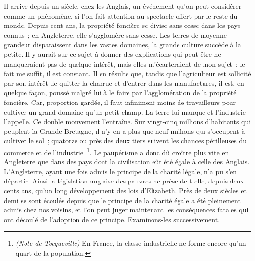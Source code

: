 \documentclass[french,twoside]{book} %
\begin{document}
Il arrive depuis un siècle, chez les Anglais, un événement qu’on peut considérer comme un phénomène, si l’on fait attention au spectacle offert par le reste du monde. Depuis cent ans, la propriété foncière se divise sans cesse dans les pays connus ; en Angleterre, elle s’agglomère sans cesse. Les terres de moyenne grandeur disparaissent dans les vastes domaines, la grande culture succède à la petite. Il y aurait sur ce sujet à donner des explications qui peut-être ne manqueraient pas de quelque intérêt, mais elles m’écarteraient de mon sujet : le fait me suffit, il est constant. Il en résulte que, tandis que l’agriculteur est sollicité par son intérêt de quitter la charrue et d’entrer dans les manufactures, il est, en quelque façon, poussé malgré lui à le faire par l’agglomération de la propriété foncière. Car, proportion gardée, il faut infiniment moins de travailleurs pour cultiver un grand domaine qu’un petit champ. La terre lui manque et l’industrie l’appelle. Ce double mouvement l’entraîne. Sur vingt-cinq millions d’habitants qui peuplent la Grande-Bretagne, il n’y en a plus que neuf millions qui s’occupent à cultiver le sol ; quatorze ou près des deux tiers suivent les chances périlleuses du commerce et de l’industrie \footnote{\emph{(Note de Tocqueville)} En France, la classe industrielle ne forme encore qu’un quart de la population. }. Le paupérisme a donc dû croître plus vite en Angleterre que dans des pays dont la civilisation eût été égale à celle des Anglais. L'Angleterre, ayant une fois admis le principe de la charité légale, n’a pu s’en départir. Ainsi la législation anglaise des pauvres ne présente-t-elle, depuis deux cents ans, qu’un long développement des lois d’Elizabeth. Près de deux siècles et demi se sont écoulés depuis que le principe de la charité égale a été pleinement admis chez nos voisins, et l’on peut juger maintenant les conséquences fatales qui ont découlé de l’adoption de ce principe. Examinons-les successivement.\par
\end{document}
